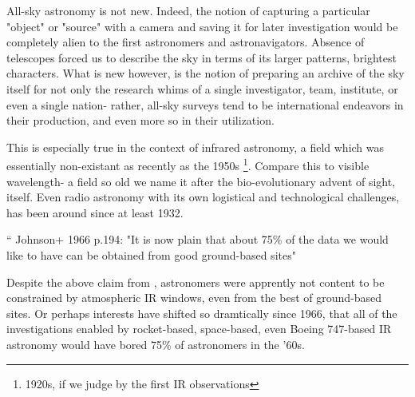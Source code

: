 All-sky astronomy is not new. Indeed, the notion of capturing a particular "object" or "source" with a camera and saving it for later investigation would be completely alien to the first astronomers and astronavigators. Absence of telescopes forced us to describe the sky in terms of its larger patterns, brightest characters. What is new however, is the notion of preparing an archive of the sky itself for not only the research whims of a single investigator, team, institute, or even a single nation- rather, all-sky surveys tend to be international endeavors in their production, and even more so in their utilization.

This is especially true in the context of infrared astronomy, a field which was essentially non-existant as recently as the 1950s \citep{johnson66} \footnote{1920s, if we judge by the first IR observations}. Compare this to visible wavelength- a field so old we name it after the bio-evolutionary advent of sight, itself. Even radio astronomy with its own logistical and technological challenges, has been around since at least 1932.

`` Johnson+ 1966 p.194: "It is now plain that about 75\% of the data we would like to have can be obtained from good ground-based sites"

Despite the above claim from \citep{johnson66}, astronomers were apprently not content to be constrained by atmospheric IR windows, even from the best of ground-based sites. Or perhaps interests have shifted so dramtically since 1966, that all of the investigations enabled by rocket-based, space-based, even Boeing 747-based IR astronomy would have bored 75\% of astronomers in the '60s.
